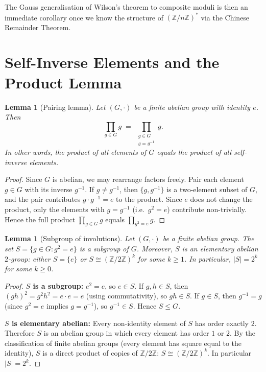 \documentclass[12pt,a4paper]{amsart}
\newtheorem{lemma}[theorem]{Lemma}
\theoremstyle{definition}
\newcommand{\Z}{\mathbb{Z}}
\begin{document}
The Gauss generalisation of Wilson's theorem to composite moduli is then
an immediate corollary once we know the structure of $(\Z/n\Z)^*$ via the
Chinese Remainder Theorem.

\section{Self-Inverse Elements and the Product Lemma}

\begin{lemma}[Pairing lemma]\label{lem:pairing}
  Let $(G, \cdot)$ be a finite abelian group with identity $e$.  Then
  \[
    \prod_{g \in G} g \;=\; \prod_{\substack{g \in G \\ g = g^{-1}}} g.
  \]
  In other words, the product of all elements of $G$ equals the product of
  all self-inverse elements.
\end{lemma}

\begin{proof}
  Since $G$ is abelian, we may rearrange factors freely.
  Pair each element $g \in G$ with its inverse $g^{-1}$.  If $g \neq g^{-1}$,
  then $\{g, g^{-1}\}$ is a two-element subset of $G$, and the pair contributes
  $g \cdot g^{-1} = e$ to the product.  Since $e$ does not change the product,
  only the elements with $g = g^{-1}$ (i.e.\ $g^2 = e$) contribute non-trivially.
  Hence the full product $\prod_{g \in G} g$ equals $\prod_{g^2=e} g$.
\end{proof}

\begin{lemma}[Subgroup of involutions]\label{lem:subgroup}
  Let $(G, \cdot)$ be a finite abelian group.  The set
  $S = \{g \in G : g^2 = e\}$ is a subgroup of $G$.  Moreover, $S$ is an
  elementary abelian $2$-group: either $S = \{e\}$ or
  $S \cong (\Z/2\Z)^k$ for some $k \geq 1$.  In particular, $|S| = 2^k$
  for some $k \geq 0$.
\end{lemma}

\begin{proof}
  \textbf{$S$ is a subgroup:} $e^2 = e$, so $e \in S$.  If $g, h \in S$,
  then $(gh)^2 = g^2 h^2 = e \cdot e = e$ (using commutativity), so $gh \in S$.
  If $g \in S$, then $g^{-1} = g$ (since $g^2 = e$ implies $g = g^{-1}$), so
  $g^{-1} \in S$.  Hence $S \leq G$.

  \textbf{$S$ is elementary abelian:}  Every non-identity element of $S$ has
  order exactly $2$.  Therefore $S$ is an abelian group in which every element
  has order $1$ or $2$.  By the classification of finite abelian groups
  (every element has square equal to the identity), $S$ is a direct product
  of copies of $\Z/2\Z$:  $S \cong (\Z/2\Z)^k$.  In particular $|S| = 2^k$.
\end{proof}
\end{document}

